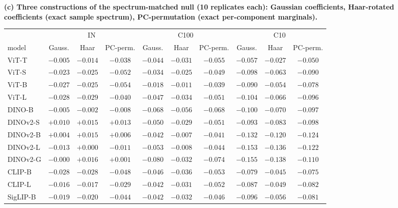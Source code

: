 \begin{table}[H]\ContinuedFloat
\centering
\scriptsize
\setlength{\tabcolsep}{2.4pt}
\begingroup
\noindent\textbf{(c) Three constructions of the spectrum-matched null (10 replicates each): Gaussian coefficients, Haar-rotated coefficients (exact sample spectrum), PC-permutation (exact per-component marginals).}\par\vspace{1.5pt}
\setlength{\tabcolsep}{3pt}
\begin{tabular}{l|ccc|ccc|ccc}
\toprule
 & \multicolumn{3}{c}{IN} & \multicolumn{3}{c}{C100} & \multicolumn{3}{c}{C10} \\
model & Gauss. & Haar & PC-perm. & Gauss. & Haar & PC-perm. & Gauss. & Haar & PC-perm. \\
\midrule
ViT-T & $-0.005$ & $-0.014$ & $-0.038$ & $-0.044$ & $-0.031$ & $-0.055$ & $-0.057$ & $-0.027$ & $-0.050$ \\
ViT-S & $-0.023$ & $-0.025$ & $-0.052$ & $-0.034$ & $-0.025$ & $-0.049$ & $-0.098$ & $-0.063$ & $-0.090$ \\
ViT-B & $-0.027$ & $-0.025$ & $-0.054$ & $-0.018$ & $-0.011$ & $-0.039$ & $-0.090$ & $-0.054$ & $-0.078$ \\
ViT-L & $-0.028$ & $-0.029$ & $-0.040$ & $-0.047$ & $-0.034$ & $-0.051$ & $-0.104$ & $-0.066$ & $-0.096$ \\
\midrule
DINO-B & $-0.005$ & $-0.002$ & $-0.008$ & $-0.068$ & $-0.056$ & $-0.068$ & $-0.100$ & $-0.070$ & $-0.097$ \\
DINOv2-S & $+0.010$ & $+0.015$ & $+0.013$ & $-0.050$ & $-0.029$ & $-0.051$ & $-0.093$ & $-0.083$ & $-0.098$ \\
DINOv2-B & $+0.004$ & $+0.015$ & $+0.006$ & $-0.042$ & $-0.007$ & $-0.041$ & $-0.132$ & $-0.120$ & $-0.124$ \\
DINOv2-L & $-0.013$ & $+0.000$ & $-0.011$ & $-0.053$ & $-0.008$ & $-0.044$ & $-0.153$ & $-0.136$ & $-0.122$ \\
DINOv2-G & $-0.000$ & $+0.016$ & $+0.001$ & $-0.080$ & $-0.032$ & $-0.074$ & $-0.155$ & $-0.138$ & $-0.110$ \\
\midrule
CLIP-B & $-0.028$ & $-0.028$ & $-0.048$ & $-0.046$ & $-0.036$ & $-0.053$ & $-0.079$ & $-0.045$ & $-0.075$ \\
CLIP-L & $-0.016$ & $-0.017$ & $-0.029$ & $-0.042$ & $-0.031$ & $-0.052$ & $-0.087$ & $-0.049$ & $-0.082$ \\
SigLIP-B & $-0.019$ & $-0.020$ & $-0.044$ & $-0.042$ & $-0.032$ & $-0.046$ & $-0.096$ & $-0.056$ & $-0.081$ \\

\end{tabular}
\end{table}
